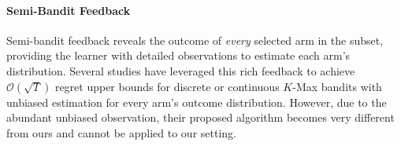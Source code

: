 \paragraph{Semi-Bandit Feedback} 
Semi-bandit feedback reveals the outcome of \emph{every} selected arm in the subset, providing the learner with detailed observations to estimate each arm's distribution.
Several studies \citep{simchowitz2016best,jun2016top,chen2016combinatorial,chen2016combinatorialt,slivkins2019introduction} have leveraged this rich feedback to achieve  $\mathcal{O}(\sqrt{T})$ regret upper bounds for discrete or continuous $K$-Max bandits with unbiased estimation for every arm's outcome distribution.
%
However, due to the abundant unbiased observation, their proposed algorithm becomes very different from ours and cannot be applied to our setting.
